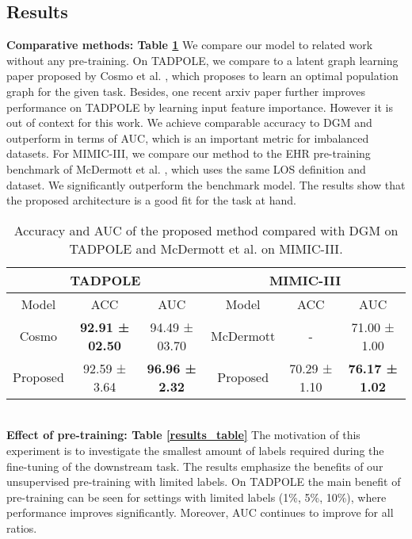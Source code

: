 \documentclass[runningheads]{llncs}
\begin{document}
\subsection{Results}
\textbf{Comparative methods: Table \ref{full_data_results}}
We compare our model to related work without any pre-training. On TADPOLE, we compare to a latent graph learning paper proposed by Cosmo et al. \cite{cosmo2020latent}, which proposes to learn an optimal population graph for the given task. 
Besides, one recent arxiv paper \cite{kazi2021ia} further improves performance on TADPOLE by learning input feature importance. However it is out of context for this work. We achieve comparable accuracy to DGM and outperform in terms of AUC, which is an important metric for imbalanced datasets. For MIMIC-III, we compare our method to the EHR pre-training benchmark of McDermott et al. \cite{mcdermott2021EHRbenchmark}, which uses the same LOS definition and dataset. We significantly outperform the benchmark model. The results show that the proposed architecture is a good fit for the task at hand.
\begin{table}[htb!]
  \caption{Accuracy and AUC of the proposed method compared with DGM on TADPOLE and McDermott et al. \cite{mcdermott2021EHRbenchmark} on MIMIC-III.}
  \centering
    \begin{tabular}{ccc|ccc}
        \toprule
         \multicolumn{3}{c|}{TADPOLE} & \multicolumn{3}{|c}{MIMIC-III} \\
        \midrule
        Model & ACC & AUC & Model & ACC & AUC \\
        \midrule 
        Cosmo \cite{cosmo2020latent} & \textbf{92.91 ± 02.50} & 94.49 ± 03.70 & McDermott \cite{mcdermott2021EHRbenchmark} & - & 71.00 ± 1.00\\
        Proposed & 92.59 ± 3.64 & \textbf{96.96 ± 2.32} & Proposed & 70.29 ± 1.10 & \textbf{76.17 ± 1.02}\\
        \bottomrule
    \end{tabular}
    \label{full_data_results}
\end{table}\\
\textbf{Effect of pre-training: Table \ref{results_table}}
The motivation of this experiment is to investigate the smallest amount of labels required during the fine-tuning of the downstream task. The results emphasize the benefits of our unsupervised pre-training with limited labels.
On TADPOLE the main benefit of pre-training can be seen for settings with limited labels (1\%, 5\%, 10\%), where performance improves significantly. Moreover, AUC continues to improve for all ratios.
\end{document}
